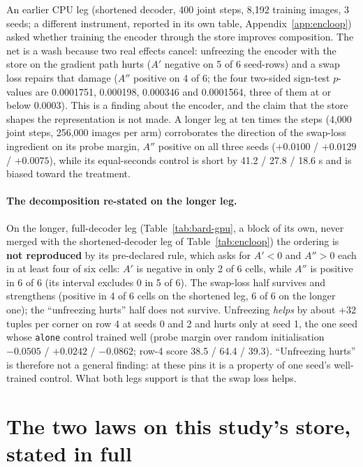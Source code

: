 \documentclass{article} %
\begin{document}
An earlier CPU leg (shortened decoder, 400 joint steps, 8,192 training images, 3 seeds; a
different instrument, reported in its own table, Appendix~\ref{app:encloop}) asked whether
training the encoder through the store improves composition. The net is a wash because two
real effects cancel: unfreezing the encoder with the store on the gradient path hurts ($A'$
negative on 5 of 6 seed-rows) and a swap loss repairs that damage ($A''$ positive on 4 of 6;
the four two-sided sign-test $p$-values are 0.0001751, 0.000198, 0.000346 and 0.0001564, three
of them at or below 0.0003). This is a finding about the encoder, and the claim
that the store shapes the representation is not made. %
A longer leg at ten times the steps (4,000 joint steps, 256,000 images per arm) corroborates
the direction of the swap-loss ingredient on its probe margin, $A''$ positive on all three
seeds ($+0.0100$ / $+0.0129$ / $+0.0075$), while its equal-seconds control is short by 41.2 /
27.8 / 18.6 s and is biased toward the treatment. %
\paragraph{The decomposition re-stated on the longer leg.} On the
longer, full-decoder leg (Table~\ref{tab:bard-gpu}, a block of its own, never merged with the
shortened-decoder leg of Table~\ref{tab:encloop}) the ordering is \textbf{not reproduced} by its
pre-declared rule, which asks for $A'<0$ and $A''>0$ each in at least four of six cells: $A'$ is
negative in only 2 of 6 cells, while $A''$ is positive in 6 of 6 (its interval excludes 0 in 5 of %
6). The swap-loss half survives and strengthens (positive in 4 of 6 cells on the shortened leg, 6 %
of 6 on the longer one); the ``unfreezing hurts'' half does not survive. Unfreezing \emph{helps} by
about +32 tuples per corner on row 4 at seeds 0 and 2 and hurts only at seed 1, the one seed whose %
\texttt{alone} control trained well (probe margin over random initialisation $-0.0505$ / %
$+0.0242$ / $-0.0862$; row-4 score 38.5 / 64.4 / 39.3). ``Unfreezing hurts'' is therefore not a %
general finding: at these pins it is a property of one seed's well-trained control. What both legs
support is that the swap loss helps.

\section{The two laws on this study's store, stated in full}
\label{app:laws}
\end{document}
